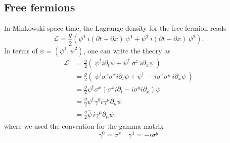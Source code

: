 \documentclass[submission, PhysLectNotes]{SciPost}
\begin{document}
\subsection{Free fermions}
In Minkowski space time, the Lagrange density for the free fermion reads
\begin{equation}
    \mathcal{L} = \frac{g}{2}\left(\psi^1\ i(\partial t + \partial x)\ \psi^1 + \psi^2\ i(\partial t - \partial x)\ \psi^2 \right).
\end{equation}
In terms of $\psi = (\psi^1,\psi^2)$, one can write the theory as
\begin{equation}
	\begin{aligned}
		\mathcal{L} &= \frac{g}{2} \left ( \ \psi^\dagger i\partial_t \psi + \psi^\dagger \ \sigma^z \ i\partial_x \psi \ \right) \nonumber \\
    &= \frac{g}{2} \left ( \ \psi^\dagger \sigma^x\sigma^x i\partial_t \psi + \psi^\dagger \ -i\sigma^x\sigma^y \ i\partial_x \psi \ \right) \nonumber\\
    &= \frac{g}{2} \psi^\dagger \sigma^x \left(\sigma^x i \partial_t - i\sigma^y i\partial_x \right) \psi \nonumber \\
    &= \frac{g}{2} \psi^\dagger \gamma^0 i\gamma^\mu \partial_\mu \psi\\
	&= \frac{g}{2} \bar{\psi} \, i\gamma^\mu \partial_\mu \psi
	\end{aligned}
\end{equation}
where we used the convention for the gamma matrix
\begin{equation}
    \gamma^0 = \sigma^x \quad \gamma^1 = -i\sigma^y
\end{equation}
\end{document}
